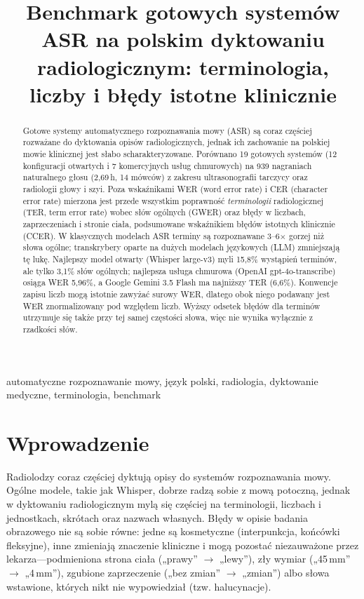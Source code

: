 \documentclass[conference]{IEEEtran}
\title{Benchmark gotowych systemów ASR na polskim dyktowaniu radiologicznym: terminologia, liczby i błędy istotne klinicznie}
\author{\IEEEauthorblockN{Konrad Strojny}\IEEEauthorblockA{E-mail: \texttt{konrad.j.strojny@gmail.com}}}
\begin{document}
\maketitle

\begin{abstract}
Gotowe systemy automatycznego rozpoznawania mowy (ASR) są coraz częściej rozważane do dyktowania opisów radiologicznych, jednak ich zachowanie na polskiej mowie klinicznej jest słabo scharakteryzowane. Porównano 19 gotowych systemów (12 konfiguracji otwartych i 7 komercyjnych usług chmurowych) na 939 nagraniach naturalnego głosu (2,69\,h, 14 mówców) z zakresu ultrasonografii tarczycy oraz radiologii głowy i szyi. Poza wskaźnikami WER (word error rate) i CER (character error rate) mierzona jest przede wszystkim poprawność \emph{terminologii} radiologicznej (TER, term error rate) wobec słów ogólnych (GWER) oraz błędy w liczbach, zaprzeczeniach i stronie ciała, podsumowane wskaźnikiem błędów istotnych klinicznie (CCER). W klasycznych modelach ASR terminy są rozpoznawane 3--6$\times$ gorzej niż słowa ogólne; transkrybery oparte na dużych modelach językowych (LLM) zmniejszają tę lukę. Najlepszy model otwarty (Whisper large-v3) myli 15,8\% wystąpień terminów, ale tylko 3,1\% słów ogólnych; najlepsza usługa chmurowa (OpenAI gpt-4o-transcribe) osiąga WER 5,96\%, a Google Gemini 3.5 Flash ma najniższy TER (6,6\%). Konwencje zapisu liczb mogą istotnie zawyżać surowy WER, dlatego obok niego podawany jest WER znormalizowany pod względem liczb. Wyższy odsetek błędów dla terminów utrzymuje się także przy tej samej częstości słowa, więc nie wynika wyłącznie z rzadkości słów.
\end{abstract}

\begin{IEEEkeywords}
automatyczne rozpoznawanie mowy, język polski, radiologia, dyktowanie medyczne, terminologia, benchmark
\end{IEEEkeywords}

\section{Wprowadzenie}
Radiolodzy coraz częściej dyktują opisy do systemów rozpoznawania mowy. Ogólne modele, takie jak Whisper, dobrze radzą sobie z mową potoczną, jednak w dyktowaniu radiologicznym mylą się częściej na terminologii, liczbach i jednostkach, skrótach oraz nazwach własnych. Błędy w opisie badania obrazowego nie są sobie równe: jedne są kosmetyczne (interpunkcja, końcówki fleksyjne), inne zmieniają znaczenie kliniczne i mogą pozostać niezauważone przez lekarza---podmieniona strona ciała („prawy'' $\to$ „lewy''), zły wymiar („45\,mm'' $\to$ „4\,mm''), zgubione zaprzeczenie („bez zmian'' $\to$ „zmian'') albo słowa wstawione, których nikt nie wypowiedział (tzw. halucynacje).
\end{document}
